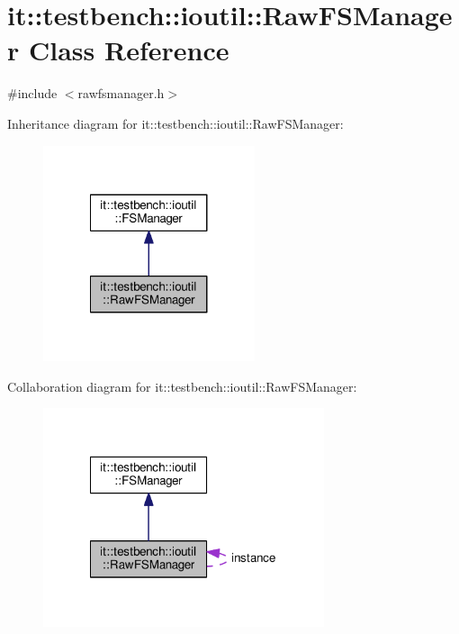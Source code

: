 \hypertarget{classit_1_1testbench_1_1ioutil_1_1RawFSManager}{\section{it\-:\-:testbench\-:\-:ioutil\-:\-:Raw\-F\-S\-Manager Class Reference}
\label{d0/d54/classit_1_1testbench_1_1ioutil_1_1RawFSManager}
}


{\ttfamily \#include $<$rawfsmanager.\-h$>$}



Inheritance diagram for it\-:\-:testbench\-:\-:ioutil\-:\-:Raw\-F\-S\-Manager\-:
\nopagebreak
\begin{figure}[H]
\begin{center}
\leavevmode
\includegraphics[width=176pt]{db/dc6/classit_1_1testbench_1_1ioutil_1_1RawFSManager__inherit__graph}
\end{center}
\end{figure}


Collaboration diagram for it\-:\-:testbench\-:\-:ioutil\-:\-:Raw\-F\-S\-Manager\-:
\nopagebreak
\begin{figure}[H]
\begin{center}
\leavevmode
\includegraphics[width=234pt]{d8/d72/classit_1_1testbench_1_1ioutil_1_1RawFSManager__coll__graph}
\end{center}
\end{figure}
